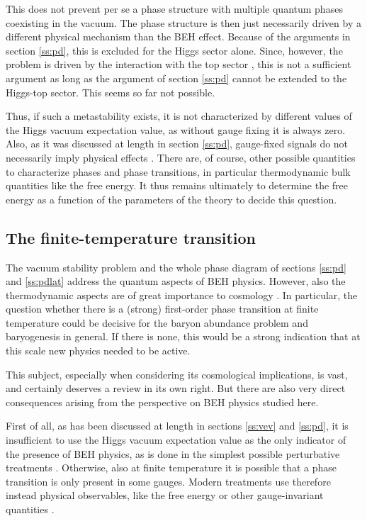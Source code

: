 \documentclass[final,12pt,3p,longtitle]{elsarticle}
\newcommand*{\1}{1\!\!\!\bot}
\begin{document}
This does not prevent per se a phase structure with multiple quantum phases coexisting in the vacuum. The phase structure is then just necessarily driven by a different physical mechanism than the BEH effect. Because of the arguments in section \ref{ss:pd}, this is excluded for the Higgs sector alone. Since, however, the problem is driven by the interaction with the top sector \cite{EliasMiro:2011aa,Alekhin:2012py}, this is not a sufficient argument as long as the argument of section \ref{ss:pd} cannot be extended to the Higgs-top sector. This seems so far not possible.

Thus, if such a metastability exists, it is not characterized by different values of the Higgs vacuum expectation value, as without gauge fixing it is always zero. Also, as it was discussed at length in section \ref{ss:pd}, gauge-fixed signals do not necessarily imply physical effects \cite{Caudy:2007sf}. There are, of course, other possible quantities to characterize phases and phase transitions, in particular thermodynamic bulk quantities like the free energy. It thus remains ultimately to determine the free energy as a function of the parameters of the theory to decide this question.

\subsection{The finite-temperature transition}\label{ss:ft}

The vacuum stability problem and the whole phase diagram of sections \ref{ss:pd} and \ref{ss:pdlat} address the quantum aspects of BEH physics. However, also the thermodynamic aspects are of great importance to cosmology \cite{Kapusta:2006pm,Dolgov:2006xi,Morrissey:2009tf}. In particular, the question whether there is a (strong) first-order phase transition at finite temperature could be decisive for the baryon abundance problem and baryogenesis in general. If there is none, this would be a strong indication that at this scale new physics needed to be active.

This subject, especially when considering its cosmological implications, is vast, and certainly deserves a review in its own right. But there are also very direct consequences arising from the perspective on BEH physics studied here.

First of all, as has been discussed at length in sections \ref{ss:vev} and \ref{ss:pd}, it is insufficient to use the Higgs vacuum expectation value as the only indicator of the presence of BEH physics, as is done in the simplest possible perturbative treatments \cite{Kapusta:2006pm}. Otherwise, also at finite temperature it is possible that a phase transition is only present in some gauges. Modern treatments use therefore instead physical observables, like the free energy or other gauge-invariant quantities \cite{DOnofrio:2015gop,Laine:2015kra,Wellegehausen:2011sc,Reichert:2017puo}.
\end{document}

